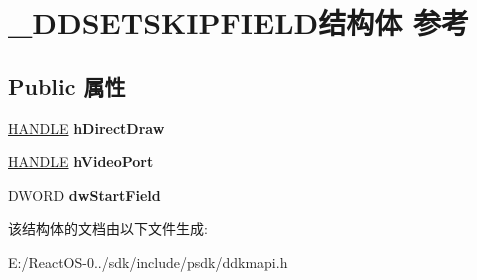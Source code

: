 \hypertarget{struct___d_d_s_e_t_s_k_i_p_f_i_e_l_d}{}\section{\+\_\+\+D\+D\+S\+E\+T\+S\+K\+I\+P\+F\+I\+E\+L\+D结构体 参考}
\label{struct___d_d_s_e_t_s_k_i_p_f_i_e_l_d}
\subsection*{Public 属性}
\begin{DoxyCompactItemize}
\item 
\mbox{\label{struct___d_d_s_e_t_s_k_i_p_f_i_e_l_d_a41266a8f4d9ddc2e2d54640ca1b8d3e8}} 
\hyperlink{interfacevoid}{H\+A\+N\+D\+LE} {\bfseries h\+Direct\+Draw}
\item 
\mbox{\label{struct___d_d_s_e_t_s_k_i_p_f_i_e_l_d_a924417e9d28a7cd815945784ee6e5ed9}} 
\hyperlink{interfacevoid}{H\+A\+N\+D\+LE} {\bfseries h\+Video\+Port}
\item 
\mbox{\label{struct___d_d_s_e_t_s_k_i_p_f_i_e_l_d_a68a8c1668ffe219e58c0a6b0545da3e4}} 
D\+W\+O\+RD {\bfseries dw\+Start\+Field}
\end{DoxyCompactItemize}


该结构体的文档由以下文件生成\+:\begin{DoxyCompactItemize}
\item 
E\+:/\+React\+O\+S-\/0../sdk/include/psdk/ddkmapi.\+h\end{DoxyCompactItemize}
